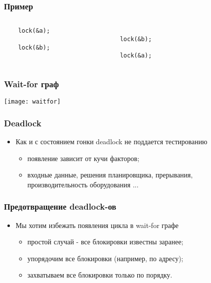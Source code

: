 \begin{frame}[fragile]
\frametitle{Пример}
\begin{columns}
    \begin{column}{.35\textwidth}
        \begin{lstlisting}
    lock(&a);

    lock(&b);

        \end{lstlisting}
    \end{column}
    \begin{column}{.35\textwidth}
        \begin{lstlisting}

    lock(&b);

    lock(&a);
        \end{lstlisting}
    \end{column}
    \begin{column}{.3\textwidth}
    \end{column}
\end{columns}
\end{frame}

\begin{frame}
\frametitle{Wait-for граф}
\texttt{[image: waitfor]}
\end{frame}

\begin{frame}
\frametitle{Deadlock}
\begin{itemize}
    \item<1->Как и с состоянием гонки deadlock не поддается тестированию
    \begin{itemize}
        \item<2->появление зависит от кучи факторов;
        \item<3->входные данные, решения планировщика, прерывания,
             производительность оборудования ...
    \end{itemize}
\end{itemize}
\end{frame}

\begin{frame}
\frametitle{Предотвращение deadlock-ов}
\begin{itemize}
    \item<1->Мы хотим избежать появления цикла в wait-for графе
    \begin{itemize}
        \item<2->простой случай - все блокировки известны заранее;
        \item<3->упорядочим все блокировки (например, по адресу);
        \item<4->захватываем все блокировки только по порядку.
    \end{itemize}
\end{itemize}
\end{frame}

